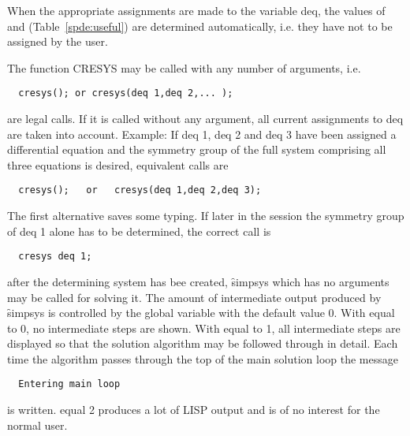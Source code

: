 When the appropriate assignments are made to the variable deq, the
values of  and  (Table~\ref{spde:useful}) are determined
automatically, i.e. they have not to be assigned by the user.

\hypertarget{operator:CRESYS}{}
The function CRESYS may be called with any number of arguments, i.e.

\begin{verbatim}
  cresys(); or cresys(deq 1,deq 2,... );
\end{verbatim}

 are legal calls. If it is called without any argument, all current
assignments to deq are taken into account. Example: If deq 1, deq 2
and deq 3 have been assigned a differential equation and the symmetry
group of the full system comprising all three equations is desired,
equivalent calls are

\begin{verbatim}
  cresys();   or   cresys(deq 1,deq 2,deq 3);
\end{verbatim}

The first alternative saves some typing. If later in the session the
symmetry group of deq 1 alone has to be determined, the correct call
is

\begin{verbatim}
  cresys deq 1;
\end{verbatim}

\hypertarget{operator:SIMPSYS}{}
after the determining system has bee created, \f{simpsys} which has no
arguments may be called for solving it. The amount of intermediate
output produced by \f{simpsys} is controlled by the global variable 
with the default value 0. With  equal to 0, no
intermediate steps are shown. With  equal to 1, all intermediate
steps are displayed so that the solution algorithm may be followed
 through in detail. Each time the algorithm
passes through the top of the main solution loop the message

\begin{verbatim}
  Entering main loop
\end{verbatim}

is written.  equal 2 produces a lot of LISP output and is of no
interest for the normal user.

